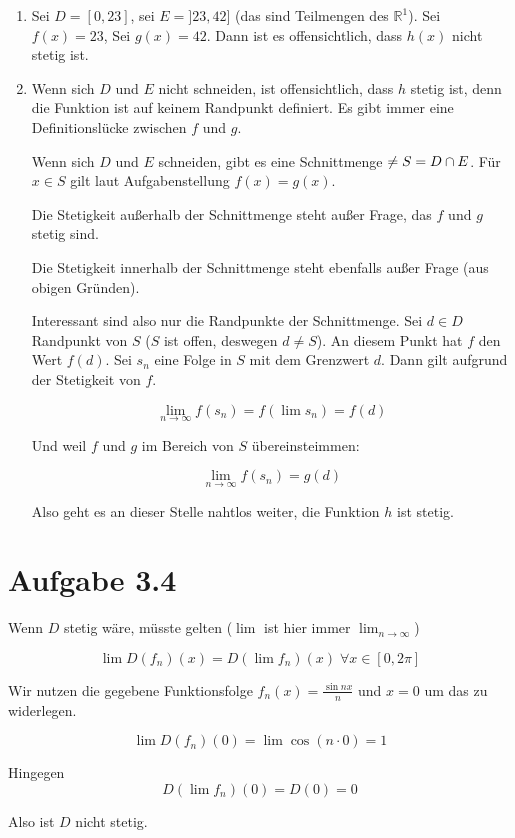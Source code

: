 \documentclass[a4paper,german,12pt,smallheadings]{scrartcl}
\begin{document}
\begin{enumerate}[(1)]
  \item
    Sei $D = [0,23]$, sei $E = ]23,42]$ (das sind Teilmengen des
    $\mathbb{R}^1$).  Sei $f(x) = 23$, Sei $g(x) = 42$. Dann ist es
    offensichtlich, dass $h(x)$ nicht stetig ist.

  \item
    Wenn sich $D$ und $E$ nicht schneiden, ist offensichtlich, dass $h$ stetig
    ist, denn die Funktion ist auf keinem Randpunkt definiert. Es gibt immer
    eine Definitionslücke zwischen $f$ und $g$.

    Wenn sich $D$ und $E$ schneiden, gibt es eine Schnittmenge $\empty \neq S = D \cap E$.
    Für $x \in S$ gilt laut Aufgabenstellung $f(x) = g(x)$.

    Die Stetigkeit außerhalb der Schnittmenge steht außer Frage, das $f$ und
    $g$ stetig sind.

    Die Stetigkeit innerhalb der Schnittmenge steht ebenfalls außer Frage (aus
    obigen Gründen).

    Interessant sind also nur die Randpunkte der Schnittmenge. Sei $d \in D$
    Randpunkt von $S$ ($S$ ist offen, deswegen $d \neq S$). An diesem Punkt hat
    $f$ den Wert $f(d)$. Sei $s_n$ eine Folge in $S$ mit dem Grenzwert $d$.
    Dann gilt aufgrund der Stetigkeit von $f$.

    \begin{equation*}
      \lim_{n \to \infty} f(s_n) = f(\lim s_n) = f(d)
    \end{equation*}

    Und weil $f$ und $g$ im Bereich von $S$ übereinsteimmen:

    \begin{equation*}
      \lim_{n \to \infty} f(s_n) = g(d)
    \end{equation*}

    Also geht es an dieser Stelle nahtlos weiter, die Funktion $h$ ist stetig.
\end{enumerate}

\section*{Aufgabe 3.4}
Wenn $D$ stetig wäre, müsste gelten ($\lim$ ist hier immer $\lim_{n \to \infty}$)

\begin{equation*}
  \lim D(f_n)(x) = D(\lim f_n)(x) \;\forall x \in [0, 2 \pi]
\end{equation*}

Wir nutzen die gegebene Funktionsfolge $f_n(x) = \frac{\sin nx}{n}$ und $x=0$
um das zu widerlegen.

\begin{equation*}
  \lim D(f_n)(0) = \lim \cos(n \cdot 0) = 1
\end{equation*}

Hingegen
\begin{equation*}
  D(\lim f_n)(0) = D(0) = 0
\end{equation*}

Also ist $D$ nicht stetig.
\end{document}
